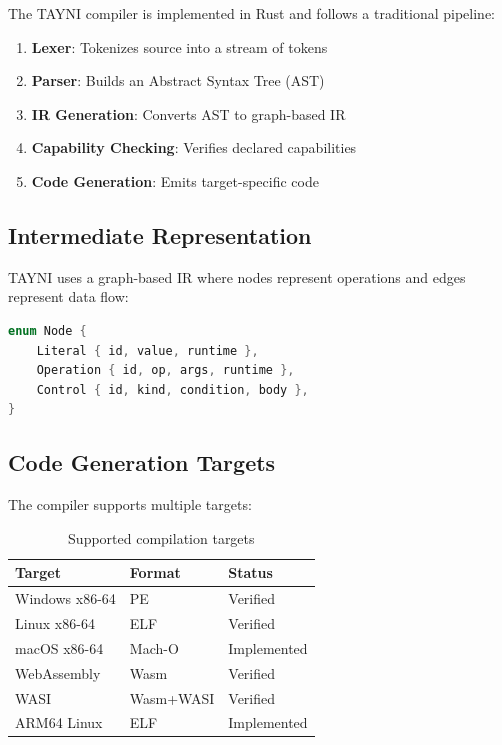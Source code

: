 \documentclass[11pt,a4paper]{article}
\begin{document}
The TAYNI compiler is implemented in Rust and follows a traditional pipeline:

\begin{enumerate}
    \item \textbf{Lexer}: Tokenizes source into a stream of tokens
    \item \textbf{Parser}: Builds an Abstract Syntax Tree (AST)
    \item \textbf{IR Generation}: Converts AST to graph-based IR
    \item \textbf{Capability Checking}: Verifies declared capabilities
    \item \textbf{Code Generation}: Emits target-specific code
\end{enumerate}

\subsection{Intermediate Representation}

TAYNI uses a graph-based IR where nodes represent operations and edges represent data flow:

\begin{lstlisting}[language=C,caption=IR node types]
enum Node {
    Literal { id, value, runtime },
    Operation { id, op, args, runtime },
    Control { id, kind, condition, body },
}
\end{lstlisting}

\subsection{Code Generation Targets}

The compiler supports multiple targets:

\begin{table}[h]
\centering
\caption{Supported compilation targets}
\begin{tabular}{lll}
\toprule
Target & Format & Status \\
\midrule
Windows x86-64 & PE & Verified \\
Linux x86-64 & ELF & Verified \\
macOS x86-64 & Mach-O & Implemented \\
WebAssembly & Wasm & Verified \\
WASI & Wasm+WASI & Verified \\
ARM64 Linux & ELF & Implemented \\
\bottomrule
\end{tabular}
\end{table}
\end{document}
